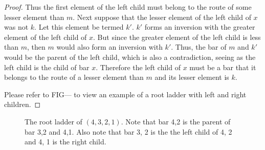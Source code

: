 \begin{proof}
    Thus the first element of the left child must belong to the route of some lesser element than $m$. Next suppose that 
    the lesser element of the left child of $x$ was not $k$. Let this element be termed $k'$.
    $k'$ forms an inversion with the greater element of the left child of $x$. But since the greater element of the left child is less than $m$, 
    then $m$ would also form an inversion with $k'$. Thus, the bar of $m$ and $k'$ would be the parent of the left child, which is also 
    a contradiction, seeing as the left child is the child of bar $x$. Therefore the left child of $x$ must be a bar that 
    it belongs to the route of a lesser element than $m$ and its lesser element is $k$.\par 
    Please refer to FIG--- to view an example of a root ladder with left and right children.\pagebreak

    
\end{proof}


\begin{figure}[!htp]
    \begin{center}
    \end{center}
    \caption{The root ladder of $(4,3,2,1)$. Note that bar 4,2 is the parent of bar 3,2 and 4,1. Also note that 
    bar 3, 2 is the the left child of 4, 2 and 4, 1 is the right child.}
\end{figure}


